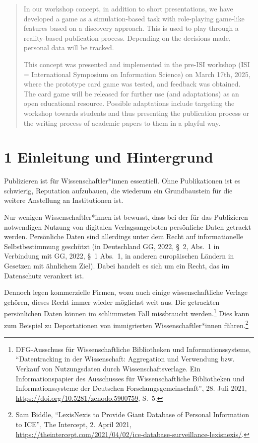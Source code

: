 \documentclass[a4paper,
fontsize=11pt,
oneside,
numbers=noperiodatend,
parskip=half-,
bibliography=totoc,
final
]{scrartcl}
\begin{document}
\begin{abstract}
In our workshop concept, in addition to short presentations, we have
developed a game as a simulation-based task with role-playing game-like
features based on a discovery approach. This is used to play through a
reality-based publication process. Depending on the decisions made,
personal data will be tracked.

This concept was presented and implemented in the pre-ISI workshop (ISI
= International Symposium on Information Science) on March 17th, 2025,
where the prototype card game was tested, and feedback was obtained. The
card game will be released for further use (and adaptations) as an open
educational resource. Possible adaptations include targeting the
workshop towards students and thus presenting the publication process or
the writing process of academic papers to them in a playful way.
\end{abstract}

\section{1 Einleitung und
Hintergrund}\label{einleitung-und-hintergrund}

Publizieren ist für Wissenschaftler*innen essentiell. Ohne Publikationen
ist es schwierig, Reputation aufzubauen, die wiederum ein Grundbaustein
für die weitere Anstellung an Institutionen ist.

Nur wenigen Wissenschaftler*innen ist bewusst, dass bei der für das
Publizieren notwendigen Nutzung von digitalen Verlagsangeboten
persönliche Daten getrackt werden. Persönliche Daten sind allerdings
unter dem Recht auf informationelle Selbstbestimmung geschützt (in
Deutschland GG, 2022, §~2, Abs.~1 in Verbindung mit GG, 2022, §~1
Abs.~1, in anderen europäischen Ländern in Gesetzen mit ähnlichem Ziel).
Dabei handelt es sich um ein Recht, das im Datenschutz verankert ist.

Dennoch legen kommerzielle Firmen, wozu auch einige wissenschaftliche
Verlage gehören, dieses Recht immer wieder möglichst weit aus. Die
getrackten persönlichen Daten können im schlimmsten Fall missbraucht
werden.\footnote{DFG-Ausschuss für Wissenschaftliche Bibliotheken und
  Informationssysteme, \enquote{Datentracking in der Wissenschaft:
  Aggregation und Verwendung bzw. Verkauf von Nutzungsdaten durch
  Wissenschaftsverlage. Ein Informationspapier des Ausschusses für
  Wissenschaftliche Bibliotheken und Informationssysteme der Deutschen
  Forschungsgemeinschaft}, 28. Juli 2021,
  \url{https://doi.org/10.5281/zenodo.5900759}, S.~5.} Dies kann zum
Beispiel zu Deportationen von immigrierten Wissenschaftler*innen
führen.\footnote{Sam Biddle, \enquote{LexisNexis to Provide Giant
  Database of Personal Information to ICE}, The Intercept, 2. April
  2021,
  \url{https://theintercept.com/2021/04/02/ice-database-surveillance-lexisnexis/}.}
\end{document}
